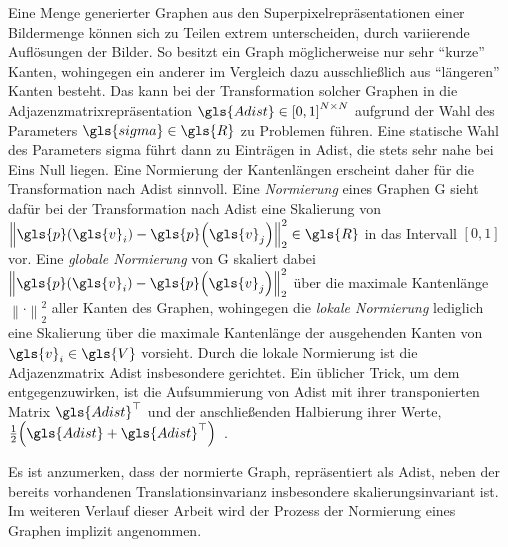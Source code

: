 Eine Menge generierter Graphen aus den Superpixelrepräsentationen einer Bildermenge können sich zu Teilen extrem unterscheiden, \bspw{} durch variierende Auflösungen der Bilder.
So besitzt ein Graph möglicherweise nur sehr \enquote{kurze} Kanten, wohingegen ein anderer im Vergleich dazu ausschließlich aus \enquote{längeren} Kanten besteht.
Das kann bei der Transformation solcher Graphen in die Adjazenzmatrixrepräsentation $\gls{Adist} \in {\left[0, 1\right]}^{N \times N}$ aufgrund der Wahl des Parameters $\gls{sigma} \in \gls{R}$ zu Problemen führen.
Eine statische Wahl des Parameters \gls{sigma} führt dann \ggf{} zu Einträgen in \gls{Adist}, die stets sehr nahe bei Eins \bzw{} Null liegen.
Eine Normierung der Kantenlängen erscheint daher für die Transformation nach \gls{Adist} sinnvoll.
Eine \emph{Normierung} eines Graphen \gls{G} sieht dafür bei der Transformation nach \gls{Adist} eine Skalierung von ${\left\|\gls{p}\left(\gls{v}_i\right) - \gls{p}\left(\gls{v}_j\right)\right\|}_2^2 \in \gls{R}$ in das Intervall $\left[0, 1\right]$ vor.
Eine \emph{globale Normierung} von \gls{G} skaliert dabei ${\left\|\gls{p}\left(\gls{v}_i\right) - \gls{p}\left(\gls{v}_j\right)\right\|}_2^2$ über die maximale Kantenlänge ${\left\|\cdot\right\|}_2^2$ aller Kanten des Graphen, wohingegen die \emph{lokale Normierung} lediglich eine Skalierung über die maximale Kantenlänge der ausgehenden Kanten von $\gls{v}_i \in \gls{V}$ vorsieht.
Durch die lokale Normierung ist die Adjazenzmatrix \gls{Adist} insbesondere gerichtet.
Ein üblicher Trick, um dem entgegenzuwirken, ist die Aufsummierung von \gls{Adist} mit ihrer transponierten Matrix $\gls{Adist}^{\top}$ und der anschließenden Halbierung ihrer Werte, \dhe{} $\frac{1}{2}\left(\gls{Adist} + \gls{Adist}^{\top}\right)$~\cite{Reuter}.

Es ist anzumerken, dass der normierte Graph, repräsentiert als \gls{Adist}, neben der bereits vorhandenen Translationsinvarianz insbesondere skalierungsinvariant ist.
Im weiteren Verlauf dieser Arbeit wird der Prozess der Normierung eines Graphen implizit angenommen.
